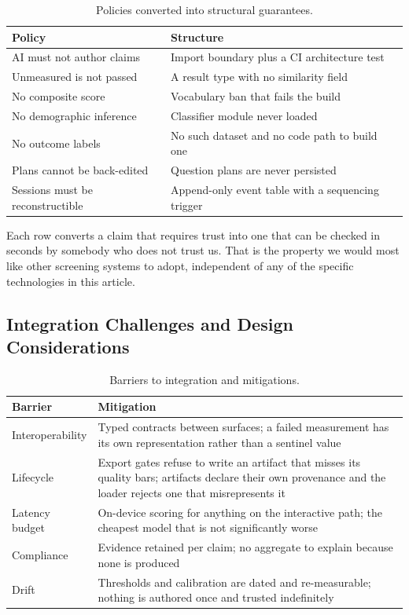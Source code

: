\begin{table}[t]
\caption{Policies converted into structural guarantees.}
\label{tab:policy-structure}
\small
\begin{tabular}{@{}p{2.4cm}p{4.9cm}@{}}
\toprule
Policy & Structure \\
\midrule
AI must not author claims & Import boundary plus a CI architecture test \\
Unmeasured is not passed & A result type with no similarity field \\
No composite score & Vocabulary ban that fails the build \\
No demographic inference & Classifier module never loaded \\
No outcome labels & No such dataset and no code path to build one \\
Plans cannot be back-edited & Question plans are never persisted \\
Sessions must be reconstructible & Append-only event table with a sequencing
trigger \\
\bottomrule
\end{tabular}
\end{table}

Each row converts a claim that requires trust into one that can be checked in seconds by somebody who does not trust us. That is the property we would most like
other screening systems to adopt, independent of any of the specific technologies
in this article.

\subsection{Integration Challenges and Design Considerations}

\begin{table}[t]
\caption{Barriers to integration and mitigations.}
\label{tab:barriers}
\small
\begin{tabular}{@{}p{1.9cm}p{5.4cm}@{}}
\toprule
Barrier & Mitigation \\
\midrule
Interoperability & Typed contracts between surfaces; a failed measurement has its
own representation rather than a sentinel value \\
Lifecycle & Export gates refuse to write an artifact that misses its quality
bars; artifacts declare their own provenance and the loader rejects one that
misrepresents it \\
Latency budget & On-device scoring for anything on the interactive path; the
cheapest model that is not significantly worse \\
Compliance & Evidence retained per claim; no aggregate to explain because none is
produced \\
Drift & Thresholds and calibration are dated and re-measurable; nothing is
authored once and trusted indefinitely \\
\bottomrule
\end{tabular}
\end{table}

